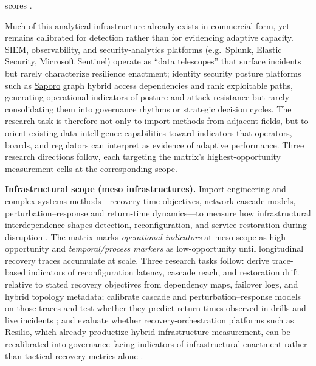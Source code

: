 scores \autocite{gillard2023efficient}.

Much of this analytical infrastructure already exists in commercial form, yet remains calibrated for detection rather than for evidencing adaptive capacity. SIEM, observability, and security-analytics platforms (e.g.\ Splunk, Elastic Security, Microsoft Sentinel) operate as ``data telescopes'' that surface incidents but rarely characterize resilience enactment; identity security posture platforms such as \href{https://saporo.io/}{Saporo} graph hybrid access dependencies and rank exploitable paths, generating operational indicators of posture and attack resistance but rarely consolidating them into governance rhythms or strategic decision cycles. The research task is therefore not only to import methods from adjacent fields, but to orient existing data-intelligence capabilities toward indicators that operators, boards, and regulators can interpret as evidence of adaptive performance. Three research directions follow, each targeting the matrix's highest-opportunity measurement cells at the corresponding scope.

\textbf{Infrastructural scope (meso infrastructures).} Import engineering and complex-systems methods---recovery-time objectives, network cascade models, perturbation--response and return-time dynamics---to measure how infrastructural interdependence shapes detection, reconfiguration, and service restoration during disruption \autocite{ives1995measuring,bruneau2003framework,gao2016universal,panteli2017metrics,krakovska2023resilience}. The matrix marks \emph{operational indicators} at meso scope as high-opportunity and \emph{temporal/process markers} as low-opportunity until longitudinal recovery traces accumulate at scale. Three research tasks follow: derive trace-based indicators of reconfiguration latency, cascade reach, and restoration drift relative to stated recovery objectives from dependency maps, failover logs, and hybrid topology metadata; calibrate cascade and perturbation--response models on those traces and test whether they predict return times observed in drills and live incidents \autocite{dawson2011agentbased,linkov2013resilience,ibnehossain2020modeling}; and evaluate whether recovery-orchestration platforms such as \href{https://www.resilio.io/}{Resilio}, which already productize hybrid-infrastructure measurement, can be recalibrated into governance-facing indicators of infrastructural enactment rather than tactical recovery metrics alone \autocite{francis2014metric,kuypers2018designing}.


